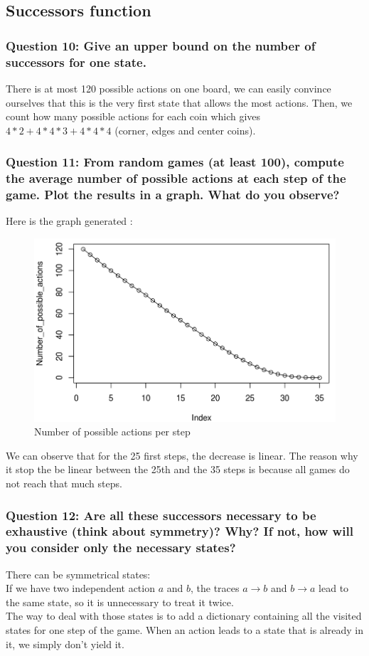 \documentclass[a4paper,10pt]{article}
\begin{document}
			\subsection{Successors function}
				\subsubsection{Question 10: Give an upper bound on the number of successors for one state.}
					There is at most 120 possible actions on one board, we can easily convince ourselves that this is the very first state that allows the most actions. Then, we count how many possible actions for each coin which gives $4*2+4*4*3+4*4*4$ (corner, edges and center coins).
				\subsubsection{Question 11: From random games (at least 100), compute the average number of possible
actions at each step of the game. Plot the results in a graph. What do you observe?}
					Here is the graph generated :
					\begin{figure}[h!]
						\centering
							\includegraphics[scale=0.4]{GraphPossActions.png}
						\caption{Number of possible actions per step}
						\label{fig:server_connection}	
					\end{figure}
					We can observe that for the 25 first steps, the decrease is linear. The reason why it stop the be linear between the 25th and the 35 steps is because all games do not reach that much steps.
					
				\subsubsection{Question 12: Are all these successors necessary to be exhaustive (think about symmetry)? Why? If not, how will you consider only the necessary states?}
					There can be symmetrical states:\\
					If we have two independent action $a$ and $b$, the traces $a\rightarrow b$ and $b\rightarrow a$ lead to the same state, so it is unnecessary to treat it twice.\\
					The way to deal with those states is to add a dictionary containing all the visited states for one step of the game. When an action leads to a state that is already in it, we simply don't yield it.
\end{document}
